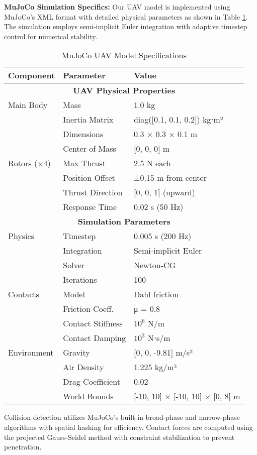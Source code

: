 \documentclass[pdflatex,sn-mathphys-num]{sn-jnl}
\theoremstyle{thmstyleone}%
\theoremstyle{thmstyletwo}%
\theoremstyle{thmstylethree}%
\begin{document}
\textbf{MuJoCo Simulation Specifics:} Our UAV model is implemented using MuJoCo's XML format with detailed physical parameters as shown in Table \ref{tab:mujoco_specs}. The simulation employs semi-implicit Euler integration with adaptive timestep control for numerical stability.

\begin{table}[h]
\centering
\caption{MuJoCo UAV Model Specifications}
\begin{tabular}{lll}
\hline
\textbf{Component} & \textbf{Parameter} & \textbf{Value} \\
\hline
\multicolumn{3}{c}{\textbf{UAV Physical Properties}} \\
\hline
Main Body & Mass & 1.0 kg \\
& Inertia Matrix & diag([0.1, 0.1, 0.2]) kg⋅m² \\
& Dimensions & 0.3 × 0.3 × 0.1 m \\
& Center of Mass & [0, 0, 0] m \\
\hline
Rotors (×4) & Max Thrust & 2.5 N each \\
& Position Offset & ±0.15 m from center \\
& Thrust Direction & [0, 0, 1] (upward) \\
& Response Time & 0.02 s (50 Hz) \\
\hline
\multicolumn{3}{c}{\textbf{Simulation Parameters}} \\
\hline
Physics & Timestep & 0.005 s (200 Hz) \\
& Integration & Semi-implicit Euler \\
& Solver & Newton-CG \\
& Iterations & 100 \\
\hline
Contacts & Model & Dahl friction \\
& Friction Coeff. & μ = 0.8 \\
& Contact Stiffness & $10^6$ N/m \\
& Contact Damping & $10^3$ N⋅s/m \\
\hline
Environment & Gravity & [0, 0, -9.81] m/s² \\
& Air Density & 1.225 kg/m³ \\
& Drag Coefficient & 0.02 \\
& World Bounds & [-10, 10] × [-10, 10] × [0, 8] m \\
\hline
\end{tabular}
\label{tab:mujoco_specs}
\end{table}

Collision detection utilizes MuJoCo's built-in broad-phase and narrow-phase algorithms with spatial hashing for efficiency. Contact forces are computed using the projected Gauss-Seidel method with constraint stabilization to prevent penetration.
\end{document}

